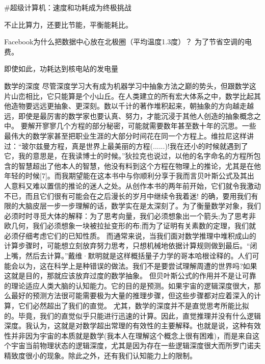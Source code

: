 #超级计算机：速度和功耗成为终极挑战

不止比算力，还要比节能，平衡能耗比。

Facebook为什么把数据中心放在北极圈（平均温度1.3度）？
为了节省空调的电费。

即使如此，功耗达到核电站的发电量

数学的深度
尽管深度学习大有成为机器学习中抽象方法之巅的势头，但跟数学这片山峦相比，它只能算是个小山丘。在人类建立的所有宏大体系之中，数学比起其他造物要远远更抽象、更深刻。数以千计的著作堆积起来，朝抽象的方向越走越远，即使是最厉害的数学家也要认真、努力，才能沉浸于其他人创造的抽象概念之中。
要解开寥寥几个方程的部分秘密，可能就需要数年甚至数十年的沉思。一些最伟大的数学家甚至把职业生涯的大部分时间花在同一个方程上。维拉尼这样讲过：“玻尔兹曼方程，真是世界上最美丽的方程(......)!我在还小的时候就遇到了它，我的意思是，在我读博士的时候。”狄拉克也说过，以他的名字命名的方程所包含的智慧超出了他本人的智慧，他没有料到这个方程在物理上的推论，尤其是在他年轻的时候[7]。而我期望能在这本书中与你顺利分享于我而言贝叶斯公式及其出人意料又难以置信的推论的迷人之处。从创作本书的两年前开始，它们就令我激动不已，而且它们很有可能会在之后漫长的岁月中继续令我着迷!
的确，要用我们有限的大脑皮层一步一步理解的话，数学实在是太深刻了。为了衡量数学对象，我们必须时时寻觅大体的解释：为了思考向量，我们必须想象出一个箭头;为了思考非欧几何，我们必须想象一块被拉扯变形的布;而为了证明有关素数的定理，我们就必须仔细考虑它们的已知性质。
而通常来说，当我们面对数学推理中堆积成山的计算步骤时，可能想立刻放弃努力思考，只想机械地依据计算规则做到最后。“闭上嘴，然后去计算。”戴维·默明就是这样概括量子力学的哥本哈根诠释的。人们可能会以为，这在科学上是种错误的做法。我们不是要尝试理解周遭的世界吗?如果这就是目的，那就应该放弃过度的数学抽象。
但贝叶斯公式的作用并不是让可靠的理论适应人类大脑的认知能力。它的目的是预测。如果宇宙的逻辑深度很大，那么最好的预测方法很可能需要极为大量的推理步骤，但这些步骤都对应着深入的计算，它们必然超出了我们的直觉。
尤其，数学的深度并不是直觉思考所能比拟的。毕竟，我们的直觉似乎只能进行迅速的计算。因此，直觉推理并没有什么逻辑深度。我认为，这就是对数学超出常理的有效性的主要解释。也就是说，这种有效性并非因为宇宙的本质就是数学(我本人在理解这个概念上很有困难)，而是来自这个宇宙当前物理状态的逻辑深度，尤其是因为存在一些逻辑深度很大而所罗门诺夫精致度很小的现象。除此之外，还有我们认知能力上的限制。

